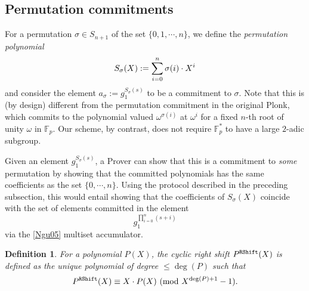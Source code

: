 \documentclass[11pt, lettersize, notitlepage, leqno, footskip=0.6cm]{article}
\newcommand{\bFp}{\mathbb{F}_p}
\newcommand{\vs}{\vspace{-0.15cm}}
\newcommand{\noin}{\noindent}
\newcommand{\Mod}[1]{\ (\mathrm{mod}\ #1)}
\newtheorem{Def}{Definition}[section]
\numberwithin{equation}{section}
\begin{document}
\bigskip


\subsection{\fontsize{11}{11}\selectfont Permutation commitments}

For a permutation $\sigma\in S_{n+1}$ of the set $\{0,1,\cdots, n\}$, we define the \textit{permutation polynomial} \vs $$ S_{\sigma}(X):= \sum\limits_{i=0}^n \sigma(i)\cdot X^i \vs $$ and consider the element $a_{\sigma}:= g_1^{S_{\sigma}(s)}$ to be a commitment to $\sigma$. Note that this is (by design) different from the permutation commitment in the original Plonk, which commits to the polynomial valued $\omega^{\sigma(i)}$ at $\omega^i$ for a fixed $n$-th root of unity $\omega$ in $\bFp$. Our scheme, by contrast, does not require $\bFp^*$ to have a large $2$-adic subgroup. 

Given an element $g_1^{S_{\sigma}(s)}$, a Prover can show that this is a commitment to \textit{some} permutation by showing that the committed polynomials has the same coefficients as the set $\{0,\cdots,n\}$. Using the protocol described in the preceding subsection, this would entail showing that the coefficients of $S_{\sigma}(X)$ coincide with the set of elements committed in the element \vs $$ g_1^{\prod\limits_{i=0}^n (s+i)}  $$ via the \hyperlink{Ngu}{[Ngu05]} multiset accumulator.


\bigskip



\begin{Def} \normalfont For a polynomial $P(X)$, the cyclic right shift $P^{{\tt{RShift}}}(X)$ is defined as the unique polynomial of degree $\leq \deg(P)$ such that \vs $$P^{{\tt{RShift}}}(X) \equiv X\cdot P(X)\Mod{X^{\deg(P)+1}-1}. $$ \end{Def}
\end{document}
